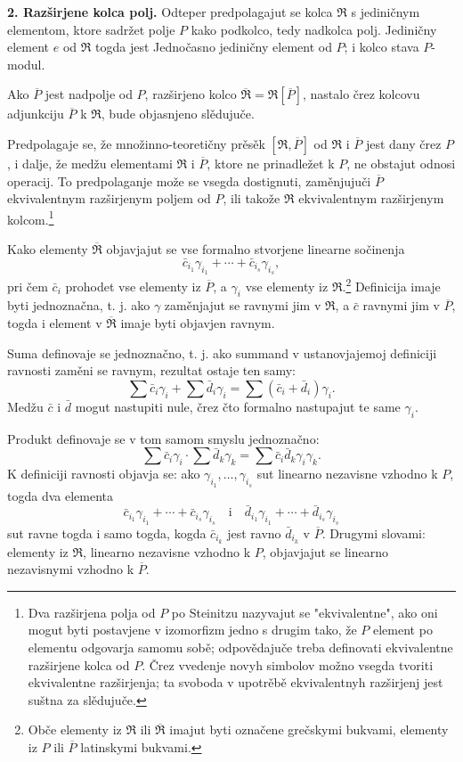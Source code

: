 \documentclass[11pt]{article}
\begin{document}
\textbf{2. Razširjene kolca polj.} Odteper predpolagajut se kolca $\mathfrak R$ s jediničnym elementom, ktore sadržet polje $P$ kako podkolco, tedy nadkolca polj. Jediničny element $e$ od $\mathfrak R$ togda jest Jednočasno jediničny element od $P$; i kolco stava $P$-modul.

Ako $\overline P$ jest nadpolje od $P$, razširjeno kolco $\overline{\mathfrak R}=\mathfrak R[\overline P]$, nastalo črez kolcovu adjunkciju $\overline P$ k $\mathfrak R$, bude objasnjeno slědujuče.

Predpolagaje se, že množinno-teoretičny prěsěk $[\mathfrak R,\overline P]$ od $\mathfrak R$ i $\overline P$ jest dany črez $P$, i dalje, že medžu elementami $\mathfrak R$ i $\overline P$, ktore ne prinadležet k $P$, ne obstajut odnosi operacij. To predpolaganje može se vsegda dostignuti, zaměnjujuči $\overline P$ ekvivalentnym razširjenym poljem od $P$, ili takože $\mathfrak R$ ekvivalentnym razširjenym kolcom.\footnote{Dva razširjena polja od $P$ po Steinitzu nazyvajut se "ekvivalentne", ako oni mogut byti postavjene v izomorfizm jedno s drugim tako, že $P$ element po elementu odgovarja samomu sobě; odpovědajuče treba definovati ekvivalentne razširjene kolca od $P$. Črez vvedenje novyh simbolov možno vsegda tvoriti ekvivalentne razširjenja; ta svoboda v upotrěbě ekvivalentnyh razširjenj jest suštna za slědujuče.}

Kako elementy $\overline{\mathfrak R}$ objavjajut se vse formalno stvorjene linearne sočinenja
\[
   \bar c_{i_1}\gamma_{i_1}+\cdots+\bar c_{i_s}\gamma_{i_s},
\]
pri čem $\bar c_i$ prohodet vse elementy iz $\overline P$, a $\gamma_i$ vse elementy iz $\mathfrak R$.\footnote{Obče elementy iz $\mathfrak R$ ili $\overline{\mathfrak R}$ imajut byti označene grečskymi bukvami, elementy iz $P$ ili $\overline P$ latinskymi bukvami.} Definicija imaje byti jednoznačna, t. j. ako $\gamma$ zaměnjajut se ravnymi jim v $\mathfrak R$, a $\bar c$ ravnymi jim v $\overline P$, togda i element v $\overline{\mathfrak R}$ imaje byti objavjen ravnym.

Suma definovaje se jednoznačno, t. j. ako summand v ustanovjajemoj definiciji ravnosti zaměni se ravnym, rezultat ostaje ten samy:
\[
   \sum \bar c_i\gamma_i+\sum \bar d_i\gamma_i
   =\sum(\bar c_i+\bar d_i)\gamma_i .
\]
Medžu $\bar c$ i $\bar d$ mogut nastupiti nule, črez čto formalno nastupajut te same $\gamma_i$.

Produkt definovaje se v tom samom smyslu jednoznačno:
\[
   \sum \bar c_i\gamma_i\cdot \sum \bar d_k\gamma_k
   =\sum \bar c_i\bar d_k\gamma_i\gamma_k .
\]
K definiciji ravnosti objavja se: ako $\gamma_{i_1},\ldots,\gamma_{i_s}$ sut linearno nezavisne vzhodno k $P$, togda dva elementa
\[
   \bar c_{i_1}\gamma_{i_1}+\cdots+\bar c_{i_s}\gamma_{i_s}
   \quad\text{i}\quad
   \bar d_{i_1}\gamma_{i_1}+\cdots+\bar d_{i_s}\gamma_{i_s}
\]
sut ravne togda i samo togda, kogda $\bar c_{i_k}$ jest ravno $\bar d_{i_k}$ v $\overline P$. Drugymi slovami: elementy iz $\mathfrak R$, linearno nezavisne vzhodno k $P$, objavjajut se linearno nezavisnymi vzhodno k $\overline P$.
\end{document}
